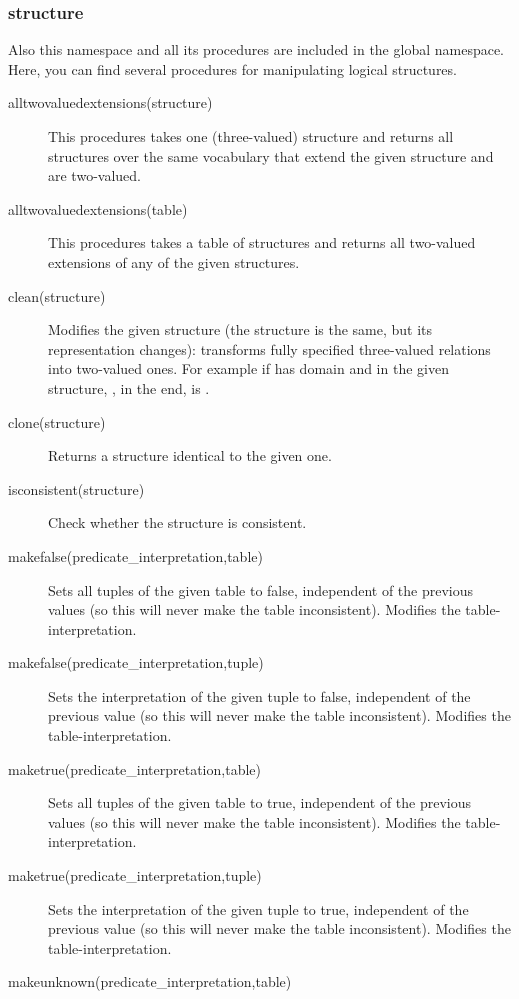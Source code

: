 \subsubsection{structure}
Also this  namespace and all its procedures are included in the global namespace. Here, you can find several procedures for manipulating logical structures.

\begin{description}
	\item[alltwovaluedextensions(structure)] This procedures takes one (three-valued) structure and returns all structures over the same vocabulary that extend the given structure and are two-valued.
	\item[alltwovaluedextensions(table)]
		This procedures takes a table of structures and returns all two-valued extensions of any of the given structures.
	\item[clean(structure)]
		Modifies the given structure (the structure is the same, but its representation changes): transforms fully specified three-valued relations into two-valued ones.  For example if  has domain \code{[1..2]} and in the given structure, , in the end,  is .
	\item[clone(structure)]
		Returns a structure identical to the given one.
	\item[isconsistent(structure)]
 		Check whether the structure is consistent.
	\item[makefalse(predicate\_interpretation,table)]
 		Sets all tuples of the given table to false, independent of the previous values (so this will never make the table inconsistent).
 		Modifies the table-interpretation.
	\item[makefalse(predicate\_interpretation,tuple)]
 		Sets the interpretation of the given tuple to false, independent of the previous value (so this will never make the table inconsistent).
 		Modifies the table-interpretation.
	\item[maketrue(predicate\_interpretation,table)]
 		Sets all tuples of the given table to true, independent of the previous values (so this will never make the table inconsistent).
 		Modifies the table-interpretation.
	\item[maketrue(predicate\_interpretation,tuple)]
 		Sets the interpretation of the given tuple to true, independent of the previous value (so this will never make the table inconsistent).
 		Modifies the table-interpretation.
	\item[makeunknown(predicate\_interpretation,table)]

\end{description}
